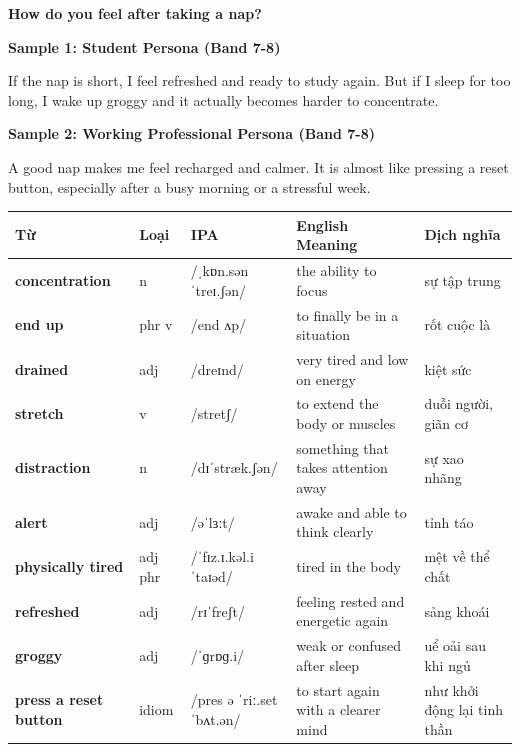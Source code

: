 \separator

\begin{ieltsquestion}
\textbf{How do you feel after taking a nap?}
\end{ieltsquestion}
\textbf{Sample 1: Student Persona (Band 7-8)}

If the nap is short, I feel refreshed and ready to study again. But if I sleep for too long, I wake up groggy and it actually becomes harder to concentrate.

\textbf{Sample 2: Working Professional Persona (Band 7-8)}

A good nap makes me feel recharged and calmer. It is almost like pressing a reset button, especially after a busy morning or a stressful week.

\separator


\vspace{0.8em}
\begin{center}
\renewcommand{\arraystretch}{1.65}
\begin{tabularx}{\textwidth}{|V{0.22\textwidth}|C{0.07\textwidth}|I{0.20\textwidth}|Y|V{0.18\textwidth}|}
\hline
{}
\textbf{Từ} & \textbf{Loại} & \textbf{IPA} & \textbf{English Meaning} & \textbf{Dịch nghĩa} \\
\hline
\textbf{concentration} & n & /ˌkɒn.sənˈtreɪ.ʃən/ & the ability to focus & sự tập trung \\ \hline
\textbf{end up} & phr v & /end ʌp/ & to finally be in a situation & rốt cuộc là \\ \hline
\textbf{drained} & adj & /dreɪnd/ & very tired and low on energy & kiệt sức \\ \hline
\textbf{stretch} & v & /stretʃ/ & to extend the body or muscles & duỗi người, giãn cơ \\ \hline
\textbf{distraction} & n & /dɪˈstræk.ʃən/ & something that takes attention away & sự xao nhãng \\ \hline
\textbf{alert} & adj & /əˈlɜːt/ & awake and able to think clearly & tỉnh táo \\ \hline
\textbf{physically tired} & adj phr & /ˈfɪz.ɪ.kəl.i ˈtaɪəd/ & tired in the body & mệt về thể chất \\ \hline
\textbf{refreshed} & adj & /rɪˈfreʃt/ & feeling rested and energetic again & sảng khoái \\ \hline
\textbf{groggy} & adj & /ˈɡrɒɡ.i/ & weak or confused after sleep & uể oải sau khi ngủ \\ \hline
\textbf{press a reset button} & idiom & /pres ə ˈriː.set ˈbʌt.ən/ & to start again with a clearer mind & như khởi động lại tinh thần \\ \hline
\end{tabularx}
\end{center}


